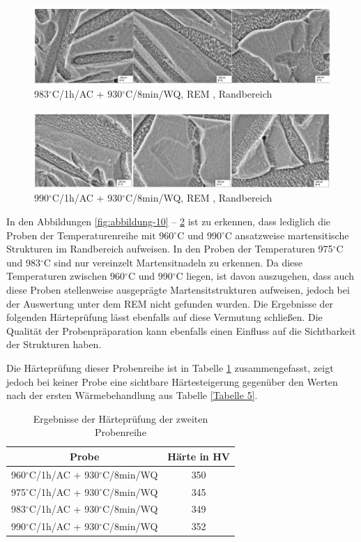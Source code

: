 \begin{figure}
	\centering
	\includegraphics[width=1.0\linewidth]{./Bilder/Abbildung 12.png}
	\caption[Abbildung 12]{983$^\circ$C/1h/AC + 930$^\circ$C/8min/WQ, REM , Randbereich}
	\label{fig:abbildung-12}
\end{figure}

\begin{figure}
	\centering
	\includegraphics[width=1.0\linewidth]{./Bilder/Abbildung 13.png}
	\caption[Abbildung 13]{990$^\circ$C/1h/AC + 930$^\circ$C/8min/WQ, REM , Randbereich}
	\label{fig:abbildung-13}
\end{figure}

In den Abbildungen \ref{fig:abbildung-10} -- \ref{fig:abbildung-13} ist zu erkennen, dass lediglich die Proben der Temperaturenreihe mit 960$^\circ$C und 990$^\circ$C ansatzweise martensitische Strukturen im Randbereich aufweisen. In den Proben der Temperaturen 975$^\circ$C und 983$^\circ$C sind nur vereinzelt Martensitnadeln zu erkennen. Da diese Temperaturen zwischen 960$^\circ$C und 990$^\circ$C liegen, ist davon auszugehen, dass auch diese Proben stellenweise ausgeprägte Martensitstrukturen aufweisen, jedoch bei der Auswertung unter dem REM nicht gefunden wurden. Die Ergebnisse der folgenden Härteprüfung lässt ebenfalls auf diese Vermutung schließen. Die Qualität der Probenpräparation kann ebenfalls einen Einfluss auf die Sichtbarkeit der Strukturen haben.

Die Härteprüfung dieser Probenreihe ist in Tabelle \ref{Tabelle 6} zusammengefasst, zeigt jedoch bei keiner Probe eine sichtbare Härtesteigerung gegenüber den Werten nach der ersten Wärmebehandlung aus Tabelle \ref{Tabelle 5}.

\begin{table}
	\centering
	\begin{tabular}{|c|c|}
		\hline 
		Probe & Härte in HV \\ 
		\hline 
		960$^\circ$C/1h/AC + 930$^\circ$C/8min/WQ & 350 \\ 
		\hline 
		975$^\circ$C/1h/AC + 930$^\circ$C/8min/WQ & 345 \\ 
		\hline 
		983$^\circ$C/1h/AC + 930$^\circ$C/8min/WQ & 349 \\ 
		\hline 
		990$^\circ$C/1h/AC + 930$^\circ$C/8min/WQ & 352 \\ 
		\hline 
	\end{tabular} 
	\caption{Ergebnisse der Härteprüfung der zweiten Probenreihe}
	\label{Tabelle 6}
\end{table}

